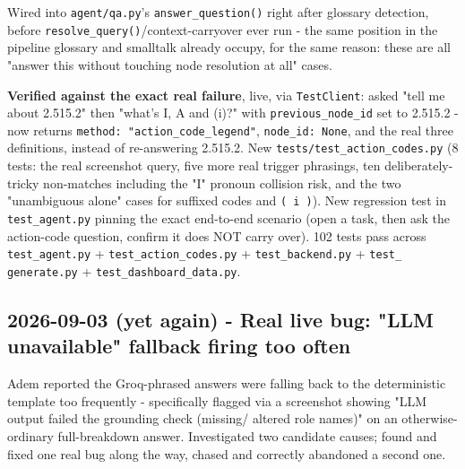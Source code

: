 Wired into \texttt{agent/\allowbreak{}qa.py}'s \texttt{answer\_\allowbreak{}question()} right after glossary detection, before \texttt{resolve\_\allowbreak{}query()}/context-carryover ever run - the same position in the pipeline glossary and smalltalk already occupy, for the same reason: these are all "answer this without touching node resolution at all" cases.

\textbf{Verified against the exact real failure}, live, via \texttt{TestClient}: asked "tell me about 2.515.2" then "what's I, A and (i)?" with \texttt{previous\_\allowbreak{}node\_\allowbreak{}id} set to 2.515.2 - now returns \texttt{method: "action\_\allowbreak{}code\_\allowbreak{}legend"}, \texttt{node\_\allowbreak{}id: None}, and the real three definitions, instead of re-answering 2.515.2. New \texttt{tests/\allowbreak{}test\_\allowbreak{}action\_\allowbreak{}codes.py} (8 tests: the real screenshot query, five more real trigger phrasings, ten deliberately-tricky non-matches including the "I" pronoun collision risk, and the two "unambiguous alone" cases for suffixed codes and \texttt{( i )}). New regression test in \texttt{test\_\allowbreak{}agent.py} pinning the exact end-to-end scenario (open a task, then ask the action-code question, confirm it does NOT carry over). 102 tests pass across \texttt{test\_\allowbreak{}agent.py} + \texttt{test\_\allowbreak{}action\_\allowbreak{}codes.py} + \texttt{test\_\allowbreak{}backend.py} + \texttt{test\_\allowbreak{} generate.py} + \texttt{test\_\allowbreak{}dashboard\_\allowbreak{}data.py}.

\subsection*{2026-09-03 (yet again) - Real live bug: "LLM unavailable" fallback firing too often}
Adem reported the Groq-phrased answers were falling back to the deterministic template too frequently - specifically flagged via a screenshot showing "LLM output failed the grounding check (missing/ altered role names)" on an otherwise-ordinary full-breakdown answer. Investigated two candidate causes; found and fixed one real bug along the way, chased and correctly abandoned a second one.

